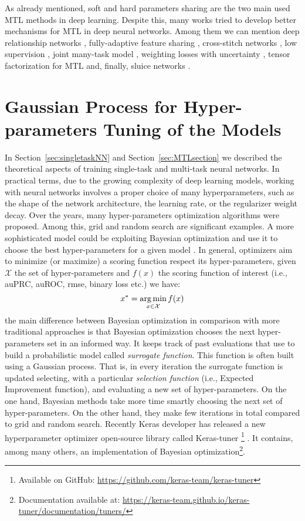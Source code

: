 As already mentioned, soft and hard parameters sharing are the two main used MTL methods in deep learning. Despite this, many works tried to develop better mechanisms for MTL in deep neural networks. Among them we can mention deep relationship networks \cite{NIPS2017_6757}, fully-adaptive feature sharing \cite{fullyadaptive}, cross-stitch networks \cite{crossstichnet}, low supervision \cite{sogaard-goldberg-2016-deep}, joint many-task model \cite{hashimoto-etal-2017-joint}, weighting losses with uncertainty \cite{Kendall}, tensor factorization for MTL \cite{Yang2017DeepMR} and, finally, sluice networks \cite{Ruder2017SluiceNL}.

\section{Gaussian Process for Hyper-parameters Tuning of the Models}
\label{sec:gaussianprocess}
In Section~\ref{sec:singletaskNN} and Section~\ref{sec:MTLsection} we
described the theoretical aspects of training single-task and multi-task neural networks. In practical terms, due to the
growing complexity of deep learning models, working with neural networks
involves a proper choice of many hyperparameters, such as the shape of
the network architecture, the learning rate, or the regularizer weight
decay. Over the years, many hyper-parameters optimization algorithms were
proposed. Among this, grid and random search \cite{BergstraB12} are significant examples. A more sophisticated model could be exploiting Bayesian optimization
and use it to choose the best hyper-parameters for a given model
\cite{SnoekGP}. In general, optimizers aim to minimize (or
maximize) a scoring function respect its hyper-parameters, given
$\mathcal{X}$ the set of hyper-parameters and $f(x)$ the scoring function of interest
(i.e., auPRC, auROC, rmse, binary loss etc.) we have: 
\[ 
x^* =  \operatorname*{arg\,min}_{x \in \mathcal{X}} f(x) 
\]
the main difference between Bayesian optimization in comparison with more
traditional approaches is that Bayesian optimization chooses the next
hyper-parameters set in an informed way. It keeps track of past evaluations
that use to build a probabilistic model called \emph{surrogate function}. This function is often built using a Gaussian process. That is, in every
iteration the surrogate function is updated selecting, with a particular
\emph{selection function} (i.e., Expected Improvement function), and
evaluating a new set of hyper-parameters. On the one hand, Bayesian methods
take more time smartly choosing the next set of hyper-parameters. On the other hand, they make few iterations in total compared to grid and random search. 
Recently Keras developer has released a new hyperparameter optimizer
open-source library called Keras-tuner \footnote{Available on GitHub:
\url{https://github.com/keras-team/keras-tuner}}
\cite{omalley2019kerastuner}. It contains, among many others, an
implementation of Bayesian optimization\footnote{Documentation available
at: \url{https://keras-team.github.io/keras-tuner/documentation/tuners/}}.


